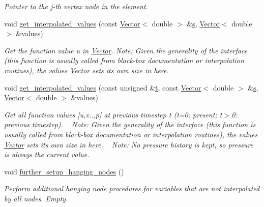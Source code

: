 \begin{DoxyCompactItemize}
\begin{DoxyCompactList}\small\item\em Pointer to the j-\/th vertex node in the element. \end{DoxyCompactList}\item 
void \hyperlink{classoomph_1_1RefineablePolarCrouzeixRaviartElement_a93600266d1ddfefb4275d4bc38f5d62c}{get\+\_\+interpolated\+\_\+values} (const \hyperlink{classoomph_1_1Vector}{Vector}$<$ double $>$ \&\hyperlink{cfortran_8h_ab7123126e4885ef647dd9c6e3807a21c}{s}, \hyperlink{classoomph_1_1Vector}{Vector}$<$ double $>$ \&values)
\begin{DoxyCompactList}\small\item\em Get the function value u in \hyperlink{classoomph_1_1Vector}{Vector}. Note\+: Given the generality of the interface (this function is usually called from black-\/box documentation or interpolation routines), the values \hyperlink{classoomph_1_1Vector}{Vector} sets its own size in here. \end{DoxyCompactList}\item 
void \hyperlink{classoomph_1_1RefineablePolarCrouzeixRaviartElement_a6d575d706d3b3689965726ca49d1a55a}{get\+\_\+interpolated\+\_\+values} (const unsigned \&\hyperlink{cfortran_8h_af6f0bd3dc13317f895c91323c25c2b8f}{t}, const \hyperlink{classoomph_1_1Vector}{Vector}$<$ double $>$ \&\hyperlink{cfortran_8h_ab7123126e4885ef647dd9c6e3807a21c}{s}, \hyperlink{classoomph_1_1Vector}{Vector}$<$ double $>$ \&values)
\begin{DoxyCompactList}\small\item\em Get all function values \mbox{[}u,v..,p\mbox{]} at previous timestep t (t=0\+: present; t$>$0\+: previous timestep). ~\newline
 Note\+: Given the generality of the interface (this function is usually called from black-\/box documentation or interpolation routines), the values \hyperlink{classoomph_1_1Vector}{Vector} sets its own size in here. ~\newline
Note\+: No pressure history is kept, so pressure is always the current value. \end{DoxyCompactList}\item 
void \hyperlink{classoomph_1_1RefineablePolarCrouzeixRaviartElement_a4dabb74925f410045d1d7208a3b29130}{further\+\_\+setup\+\_\+hanging\+\_\+nodes} ()
\begin{DoxyCompactList}\small\item\em Perform additional hanging node procedures for variables that are not interpolated by all nodes. Empty. \end{DoxyCompactList}\item 

\end{DoxyCompactItemize}
